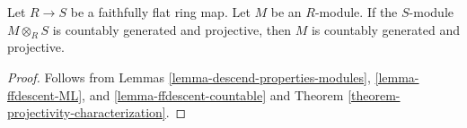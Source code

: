 \begin{lemma}
\label{lemma-ffdescent-countable-projectivity}
Let $R \to S$ be a faithfully flat ring map.  Let $M$ be an $R$-module.
 If the $S$-module $M \otimes_R S$ is countably generated and projective,
then $M$ is countably generated and projective.
\end{lemma}

\begin{proof}
Follows from Lemmas \ref{lemma-descend-properties-modules},
\ref{lemma-ffdescent-ML}, and \ref{lemma-ffdescent-countable} and
Theorem \ref{theorem-projectivity-characterization}.
\end{proof}
